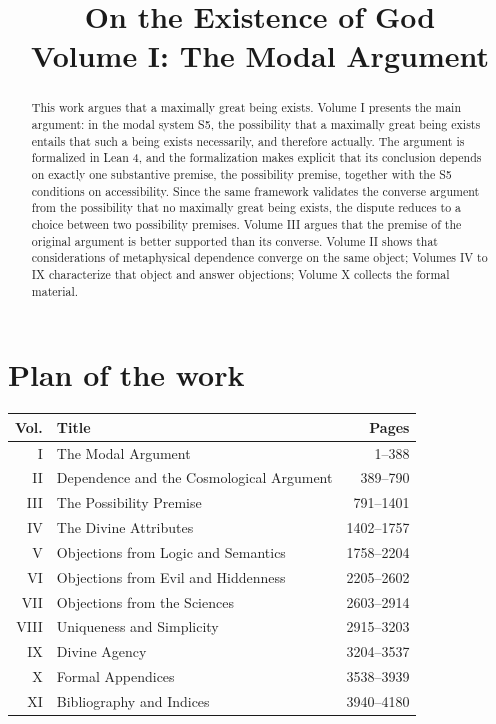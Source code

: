 \documentclass{situationist-preprint}
\title{On the Existence of God\\[0.4em]\large Volume I: The Modal Argument}
\begin{document}
\maketitle

\begin{abstract}
This work argues that a maximally great being exists. Volume I presents the main argument: in the modal system S5, the possibility that a maximally great being exists entails that such a being exists necessarily, and therefore actually. The argument is formalized in Lean 4, and the formalization makes explicit that its conclusion depends on exactly one substantive premise, the possibility premise, together with the S5 conditions on accessibility. Since the same framework validates the converse argument from the possibility that no maximally great being exists, the dispute reduces to a choice between two possibility premises. Volume III argues that the premise of the original argument is better supported than its converse. Volume II shows that considerations of metaphysical dependence converge on the same object; Volumes IV to IX characterize that object and answer objections; Volume X collects the formal material.
\end{abstract}

\section*{Plan of the work}

\begin{center}\small
\begin{tabular}{@{}rlr@{}}
\toprule
Vol. & Title & Pages \\
\midrule
I & The Modal Argument & 1--388 \\
II & Dependence and the Cosmological Argument & 389--790 \\
III & The Possibility Premise & 791--1401 \\
IV & The Divine Attributes & 1402--1757 \\
V & Objections from Logic and Semantics & 1758--2204 \\
VI & Objections from Evil and Hiddenness & 2205--2602 \\
VII & Objections from the Sciences & 2603--2914 \\
VIII & Uniqueness and Simplicity & 2915--3203 \\
IX & Divine Agency & 3204--3537 \\
X & Formal Appendices & 3538--3939 \\
XI & Bibliography and Indices & 3940--4180 \\
\bottomrule
\end{tabular}
\end{center}
\end{document}
